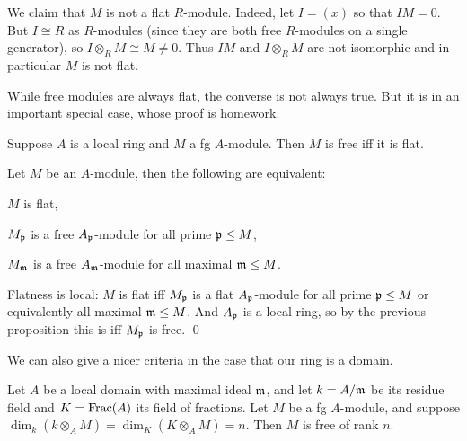     We claim that $M$ is not a flat $R$-module.
    Indeed, let $I=(x)$ so that $IM=0$.
    But $I\cong R$ as $R$-modules (since they are both free $R$-modules on a single generator), so $I\otimes_RM\cong M\neq0$.
    Thus $IM$ and $I\otimes_RM$ are not isomorphic and in particular $M$ is not flat.

\eexam

While free modules are always flat, the converse is not always true.
But it is in an important special case, whose proof is homework.

\bprop

    Suppose $A$ is a local ring and $M$ a fg $A$-module.
    Then $M$ is free iff it is flat.

\eprop

\bcoro

    Let $M$ be an $A$-module, then the following are equivalent:
    \benum
        \item $M$ is flat,
        \item $M_{{\frak p}}$ is a free $A_{{\frak p}}$-module for all prime ${{\frak p}}\leq M$,
        \item $M_{{\frak m}}$ is a free $A_{{\frak m}}$-module for all maximal ${{\frak m}}\leq M$.
    \eenum

\ecoro

\bproof

    Flatness is local: $M$ is flat iff $M_{{\frak p}}$ is a flat $A_{{\frak p}}$-module for all prime ${{\frak p}}\leq M$ or equivalently all maximal ${{\frak m}}\leq M$.
    And $A_{{\frak p}}$ is a local ring, so by the previous proposition this is iff $M_{{\frak p}}$ is free.
    \qed

\eproof

We can also give a nicer criteria in the case that our ring is a domain.

\blemm

    Let $A$ be a local domain with maximal ideal ${{\frak m}}$, and let $k=A/{{\frak m}}$ be its residue field and $K={\rm Frac}(A)$ its field of fractions.
    Let $M$ be a fg $A$-module, and suppose $\dim_k(k\otimes_AM)=\dim_K(K\otimes_AM)=n$.
    Then $M$ is free of rank $n$.

\elemm

\bproof

